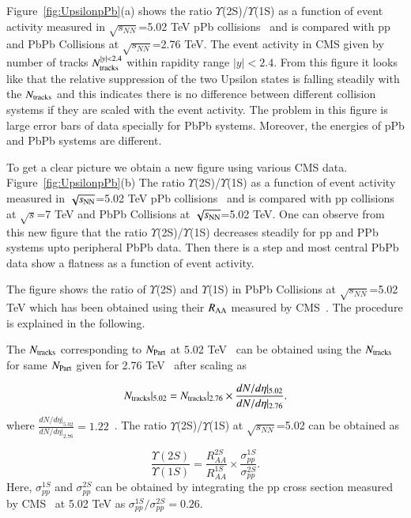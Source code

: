 Figure~\ref{fig:UpsilonpPb}(a) shows
the ratio $\Upsilon$(2S)/$\Upsilon$(1S) as a function of event activity measured in 
$\sqrt{s_{NN}}$=5.02 TeV pPb collisions~\cite{CMS:2013jsu} and is compared with pp
and PbPb Collisions at $\sqrt{s_{NN}}$=2.76 TeV.
The event activity in CMS given by number of tracks $N_{\rm tracks}^{|y|<2.4}$ within rapidity
range $|y|<2.4$. From this figure it looks like that the relative suppression of
the two Upsilon states is falling steadily with the $N_{\rm tracks}$  and
this indicates there is no difference between different collision systems if
they are scaled with the event activity. The problem in this figure is large error bars
of data specially for PbPb systems. Moreover, the energies of pPb and PbPb systems
are different.

To get a clear picture we obtain a new figure using various CMS data.
Figure~\ref{fig:UpsilonpPb}(b) The ratio $\Upsilon$(2S)/$\Upsilon$(1S) as a function of
event activity measured in $\sqrt{s_{\rm NN}}$=5.02 TeV pPb collisions~\cite{CMS:2013jsu}
and is compared with pp collisions at $\sqrt{s}$=7 TeV \cite{CMS:2020fae} and
PbPb Collisions at $\sqrt{s_{\rm NN}}$=5.02 TeV. One can observe from this new figure
that the ratio $\Upsilon$(2S)/$\Upsilon$(1S) decreases steadily for pp and PPb systems
upto peripheral PbPb data. Then there is a step and most central PbPb
data show a flatness as a function of event activity. 

The figure shows the ratio of $\Upsilon$(2S) and $\Upsilon$(1S) in PbPb Collisions at
$\sqrt{s_{NN}}$=5.02 TeV which has been obtained using their $R_{\rm AA}$ measured by
CMS~\cite{CMS:2022wfi}. The procedure is explained in the following.

The $N_{\rm tracks}$ corresponding to $N_{\rm Part}$ at 5.02 TeV~\cite{CMS:2018zza}
can be obtained using the $N_{\rm tracks}$ for same $N_{\rm Part}$ given
for 2.76 TeV~\cite{CMS:2013jsu} after scaling as

\begin{equation}
N_{\rm tracks}|_{5.02} =  N_{\rm tracks}|_{2.76} \times \frac{dN/d\eta |_{5.02}} {dN/d\eta|_{2.76}}.
\end{equation}
where $\frac{dN/d\eta |_{5.02}} {dN/d\eta|_{2.76}}=1.22$~\cite{eta}.
The ratio $\Upsilon$(2S)/$\Upsilon$(1S) at $\sqrt{s_{NN}}$=5.02 can be obtained as 

\begin{equation}
\frac{\Upsilon(2S)}{\Upsilon(1S)} = \frac{R_{AA}^{2S}}{R_{AA}^{1S}} \times \frac{\sigma_{pp}^{1S}}{\sigma_{pp}^{2S}}.
\end{equation}
Here, $\sigma_{pp}^{1S}$ and $\sigma_{pp}^{2S}$ can be obtained by integrating the pp cross section
measured by CMS~\cite{CMS:2013jsu} at 5.02 TeV as $\sigma_{pp}^{1S}/\sigma_{pp}^{2S}=0.26$.





